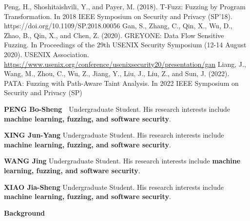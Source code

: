 \documentclass[10.5pt,compsoc]{CjC}
\theoremstyle{mystyle}
\begin{document}
\begin{thebibliography}{99}
  Peng, H., Shoshitaishvili, Y., and Payer, M. (2018). T-Fuzz: Fuzzing by Program Transformation. In 2018 IEEE Symposium on Security and Privacy (SP'18). https://doi.org/10.1109/SP.2018.00056
  Gan, S., Zhang, C., Qin, X., Wu, D., Zhao, B., Qin, X., and Chen, Z. (2020). GREYONE: Data Flow Sensitive Fuzzing. In Proceedings of the 29th USENIX Security Symposium (12-14 August 2020). USENIX Association. 
  \url{https://www.usenix.org/conference/usenixsecurity20/presentation/gan}
  Liang, J., Wang, M., Zhou, C., Wu, Z., Jiang, Y., Liu, J., Liu, Z., and Sun, J. (2022). PATA: Fuzzing with Path-Aware Taint Analysis. In 2022 IEEE Symposium on Security and Privacy (SP)
\end{thebibliography}

\begin{biography}
\noindent
\textbf{PENG Bo-Sheng}\ \ Undergraduate Student. His research interests include \textbf{machine learning, fuzzing, and software security}.
\end{biography}

\vspace{10mm}
\begin{biography}
\noindent
\textbf{XING Jun-Yang} Undergraduate Student. His research interests include \textbf{machine learning, fuzzing, and software security}.
\end{biography}
\vspace{10mm}

\begin{biography}
  \noindent
  \textbf{WANG Jing} Undergraduate Student. His research interests include \textbf{machine learning, fuzzing, and software security}.
\end{biography}

\vspace{10mm}
\begin{biography}
\noindent
\textbf{XIAO Jia-Sheng} Undergraduate Student. His research interests include \textbf{machine learning, fuzzing, and software security}.
\end{biography}

\vspace{10mm}

\begin{strip}
\end{strip}

\noindent \textbf{Background}

 
\end{document}
